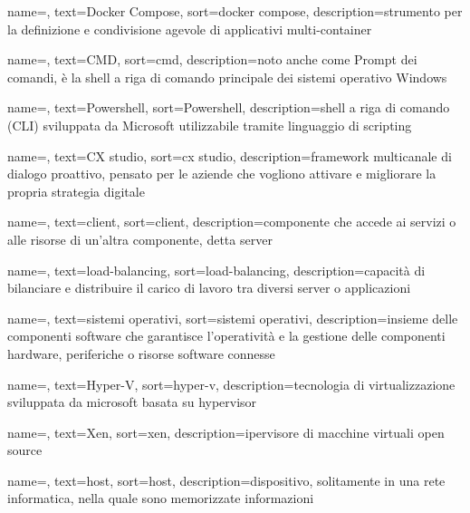 {
    name=,
    text=Docker Compose,
    sort=docker compose, 
    description={strumento per la definizione e condivisione agevole di applicativi multi-container}
}

{
    name=,
    text=CMD,
    sort=cmd, 
    description={noto anche come Prompt dei comandi, è la shell a riga di comando principale dei sistemi operativo Windows}
}

{
    name=,
    text=Powershell,
    sort=Powershell, 
    description={shell a riga di comando (CLI) sviluppata da Microsoft utilizzabile tramite linguaggio di scripting}
}

{
    name=,
    text=CX studio,
    sort=cx studio, 
    description={framework multicanale di dialogo proattivo, pensato per le aziende che vogliono attivare e migliorare la propria strategia digitale}
}

{
    name=,
    text=client,
    sort=client, 
    description={componente che accede ai servizi o alle risorse di un'altra componente, detta server}
}

{
    name=,
    text=load-balancing,
    sort=load-balancing, 
    description={capacità di bilanciare e distribuire il carico di lavoro tra diversi server o applicazioni}
}

{
    name=,
    text=sistemi operativi,
    sort=sistemi operativi, 
    description={insieme delle componenti software che garantisce l'operatività e la gestione delle componenti hardware, periferiche o risorse software connesse}
}

{
    name=,
    text=Hyper-V,
    sort=hyper-v, 
    description={tecnologia di virtualizzazione sviluppata da microsoft basata su hypervisor}
}

{
    name=,
    text=Xen,
    sort=xen, 
    description={ipervisore di macchine virtuali open source}
}

{
    name=,
    text=host,
    sort=host, 
    description={dispositivo, solitamente in una rete informatica, nella quale sono memorizzate informazioni}
}

